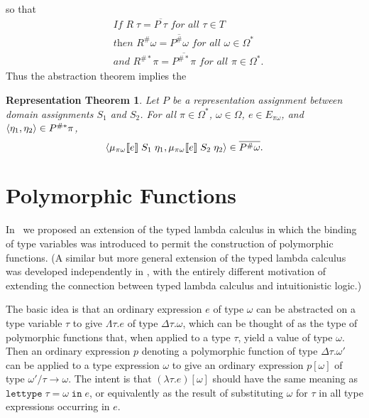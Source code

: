 \documentclass[sigplan,screen,nonacm,balance=false]{acmart}
\theoremstyle{plain}
\DeclarePairedDelimiter{\pair}{\langle}{\rangle}
\DeclarePairedDelimiter{\interp}{\llbracket}{\rrbracket}
\newcommand{\lettypein}[3]{\mathtt{lettype} \; #1 = #2 \; \mathtt{in} \; #3}
\begin{document}
%
so that
%
\begin{align*}
  & \textit{If } R \; \tau = \overline{P \; \tau} \textit{ for all } \tau \in T \\
  & \textit{then } R^\# \omega = \overline{P^\# \omega} \textit{ for all } \omega \in \Omega^* \\
  & \textit{and } R^{\#*} \pi = \overline{P^{\#*} \pi} \textit{ for all } \pi \in \Omega^*.
\end{align*}
%
Thus the abstraction theorem implies the

\newtheorem*{representation}{Representation Theorem}
\begin{representation}
  Let $P$ be a representation assignment between domain assignments $S_1$ and $S_2$.
  For all $\pi \in \Omega^*$, $\omega \in \Omega$, $e \in E_{\pi \omega}$, and $\pair{\eta_1, \eta_2} \in P^{\#*} \pi$,
  \begin{equation*}
    \pair{\mu_{\pi \omega} \interp{e} \; S_1 \; \eta_1, \mu_{\pi \omega} \interp{e} \; S_2 \; \eta_2} \in \overline{P^\# \omega}.
  \end{equation*}
\end{representation}

\section{Polymorphic Functions} \label{sec:poly-fun}

In~\citep{polymorphism} we proposed an extension of the typed lambda calculus in which the binding of type variables was introduced to permit the construction of polymorphic functions.
(A similar but more general extension of the typed lambda calculus was developed independently in \citep{SystemF}, with the entirely different motivation of extending the connection between typed lambda calculus and intuitionistic logic.)

The basic idea is that an ordinary expression $e$ of type $\omega$ can be abstracted on a type variable $\tau$ to give $\Lambda \tau. e$ of type $\Delta \tau. \omega$, which can be thought of as the type of polymorphic functions that, when applied to a type $\tau$, yield a value of type $\omega$.
Then an ordinary expression $p$ denoting a polymorphic function of type $\Delta \tau. \omega'$ can be applied to a type expression $\omega$ to give an ordinary expression $p[\omega]$ of type $\omega'/\tau \to \omega$.
The intent is that $(\lambda \tau. e)[\omega]$ should have the same meaning as $\lettypein{\tau}{\omega}{e}$, or equivalently as the result of substituting $\omega$ for $\tau$ in all type expressions occurring in $e$.
\end{document}
